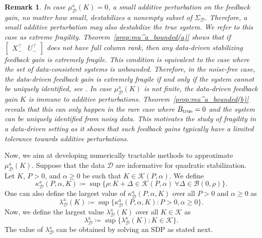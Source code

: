 \documentclass[9pt,shortpaper,twoside,web]{ieeecolor}
\newcommand{\mac}[1]{\mathcal{#1}}
\newtheorem{remark}[theorem]{Remark}
\begin{document}
\begin{remark}
\label{rem:1}
In case $\mu_{\mathcal{D}}^{\text{a}}(K)=0$, a small additive perturbation on the feedback gain, no matter how small, destabilizes a nonempty subset of $\Sigma_\mathcal{D}$. Therefore, a small additive perturbation may also destabilize the true system. We refer to this case as \emph{extreme fragility}. Theorem~\ref{prop:mu^a_bounded(a)} shows that if $\begin{bmatrix}
X_-^\top & U_-^\top
\end{bmatrix}$ does not have full column rank, then any data-driven stabilizing feedback gain is extremely fragile. This condition is equivalent to the case where the set of data-consistent systems is unbounded. Therefore, in the noise-free case, the data-driven feedback gain is extremely fragile \emph{if and only if} the system cannot be uniquely identified, see \cite[Prop. 6]{van2020data}. In case $\mu_{\mathcal{D}}^{\text{a}}(K)$ is not finite, the data-driven feedback gain $K$ is \emph{immune} to additive perturbations. Theorem~\ref{prop:mu^a_bounded(b)} reveals that this can only happen in the rare case where $B_{\textup{true}}=0$ and the system can be uniquely identified from noisy data. This motivates the study of fragility in a data-driven setting as it shows that such feedback gains typically have a limited tolerance towards additive perturbations.
\end{remark}

Now, we aim at developing numerically tractable methods to approximate $\mu_{\mathcal{D}}^{\text{a}}(K)$. Suppose that the data $\mathcal{D}$ are informative for quadratic stabilization. Let $K$, $P>0$, and $\alpha\geq 0$ be such that $K\in\mathcal{K}(P,\alpha)$. We define
\begin{equation}
\kappa_{\mathcal{D}}^{\text{a}}(P,\alpha,K)\coloneqq \sup \{\rho:K+\Delta \in \mathcal{K}(P,\alpha) \ \forall\Delta \in \mathcal{B}(0,\rho)\}.
\end{equation}
One can also define the largest value of $\kappa_{\mathcal{D}}^{\text{a}}(P,\alpha,K)$ over all $P > 0$ and $\alpha \geq 0$ as
\begin{equation}
\label{eq:def_lam_K}
    \lambda^\text{a}_\mac{D}(K) \coloneqq\sup\{\kappa^a_\mac{D}(P,\alpha,K):P >0,\alpha \geq 0\}.
\end{equation} 
Now, we define the largest value $\lambda^\text{a}_\mac{D}(K)$ over all $K \in \mathcal{K}$ as 
\begin{equation}
\label{eq:def_lam_optK}
    \lambda^\text{a}_\mac{D}\coloneqq \sup \{\lambda^\text{a}_\mac{D}(K):K \in \mac{K}\}.
\end{equation}
The value of $\lambda^\text{a}_\mac{D}$ can be obtained by solving an SDP as stated next.
\end{document}
